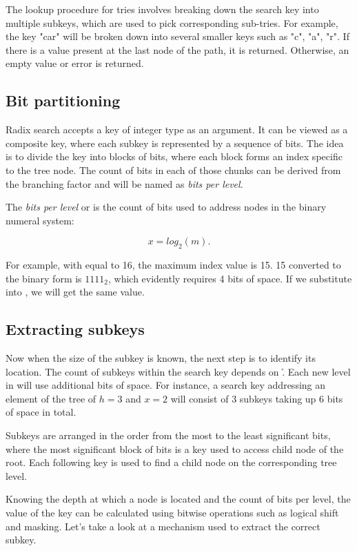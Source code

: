 The lookup procedure for tries involves breaking down the search key into multiple subkeys, which are used to pick corresponding sub-tries. For example, the key "car" will be broken down into several smaller keys such as "c", "a", "r". If there is a value present at the last node of the path, it is returned. Otherwise, an empty value or error is returned. 

\subsection*{Bit partitioning}
Radix search accepts a key of integer type as an argument. It can be viewed as a composite key, where each subkey is represented by a sequence of bits. The idea is to divide the key into blocks of bits, where each block forms an index specific to the tree node. The count of bits in each of those chunks can be derived from the branching factor and will be named as \emph{bits per level}.

The \emph{bits per level} or \x{} is the count of bits used to address \m{} nodes in the binary numeral system:

\begin{equation}
    \label{eq:bits-per-level}
    x = log_2(m).
\end{equation}

For example, with \m{} equal to 16, the maximum index value is 15. 15 converted to the binary form is $1111_2$, which evidently requires 4 bits of space. If we substitute \m{} into , we will get the same value. 

\subsection*{Extracting subkeys}

Now when the size of the subkey is known, the next step is to identify its location. The count of subkeys within the search key depends on \h. Each new level in \rbtree{} will use \x{} additional bits of space. For instance, a search key addressing an element of the tree of ${h = 3}$ and ${x = 2}$ will consist of 3 subkeys taking up 6 bits of space in total.

Subkeys are arranged in the order from the most to the least significant bits, where the most significant block of bits is a key used to access child node of the root. Each following key is used to find a child node on the corresponding tree level.

Knowing the depth at which a node is located and the count of bits per level, the value of the key can be calculated using bitwise operations such as logical shift and masking. Let's take a look at a mechanism used to extract the correct subkey. 

